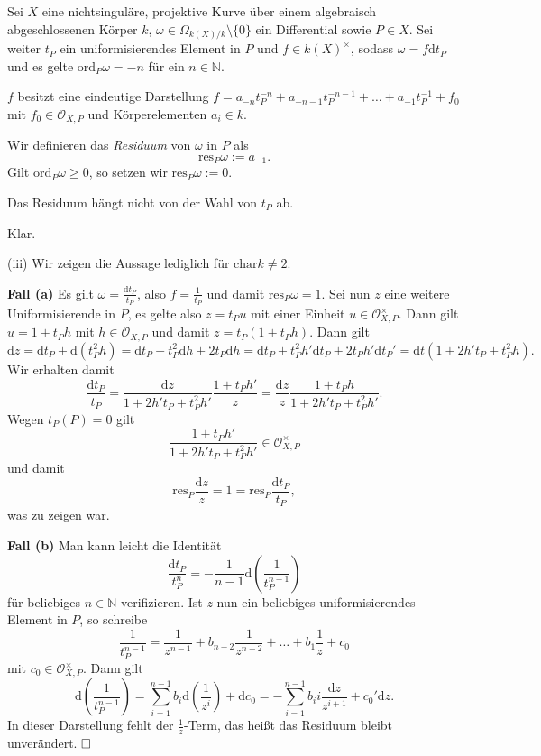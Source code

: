 \documentclass[11pt]{book}
\theoremstyle{nonumberbreak}
\newenvironment{pr}[1][]{\ifthenelse{\equal{#1}{}}{\proof}{\proof[#1]}\rm}{\endproof}
\newenvironment{definbem}[1][]{\ifthenelse{\equal{#1}{}}{\definibem}{\definibem[#1]}\rm}{\enddefinibem}
\begin{document}
\begin{spacing}{1.4}
\begin{definbem}
Sei $X$ eine nichtsinguläre, projektive Kurve über einem algebraisch abgeschlossenen Körper $k$, $\omega \in \Omega_{k(X)/k} \setminus \{0\}$ ein Differential sowie $P \in X$. Sei weiter $t_P$ ein uniformisierendes Element in $P$ und $f \in k(X)^{\times}$, sodass $\omega = f \mathrm{d}t_P$ und es gelte $\mathrm{ord}_P \omega = -n$ für ein $n \in \mathbb{N}$.
\begin{compactenum}
\item $f$ besitzt eine eindeutige Darstellung $f=a_{-n}t_P^{-n} + a_{-n-1} t_P^{-n-1} + \ldots + a_{-1} t_P^{-1} + f_0$ mit $f_0 \in \mathcal{O}_{X,P}$ und Körperelementen $a_i \in k$.
\item Wir definieren das \textit{Residuum} von $\omega$ in $P$ als 
$$\mathrm{res}_P \omega := a_{-1}.$$
Gilt $\mathrm{ord}_P \omega \geqslant 0$, so setzen wir $\mathrm{res}_P \omega :=0$.
\item Das Residuum hängt nicht von der Wahl von $t_P$ ab.
\end{compactenum}
\begin{pr}
\begin{compactenum}
\item Klar.
\item[(iii)] Wir zeigen die Aussage lediglich für $\mathrm{char}k \neq 2$.
\begin{compactenum}

\item[\textbf{Fall (a)}] Es gilt $\omega = \frac{\mathrm{d}t_P}{t_P}$, also $f= \frac{1}{t_P}$ und damit $\mathrm{res}_P \omega = 1$. Sei nun $z$ eine weitere Uniformisierende in $P$, es gelte also $z = t_Pu$ mit einer Einheit $u \in \mathcal{O}_{X,P}^{\times}$. Dann gilt $u=1 + t_P h$ mit $h \in \mathcal{O}_{X,P}$ und damit $z= t_P ( 1 + t_P h)$. Dann gilt 
$$\mathrm{d}z = \mathrm{d}t_P + \mathrm{d}(t_P^2h) = \mathrm{d}t_P + t_P^2 \mathrm{d}h + 2t_P \mathrm{d}h = \mathrm{d}t_P + t_P^2 h' \mathrm{d}t_P + 2 t_P h' \mathrm{d}t_P' =  \mathrm{d}t ( 1 + 2h't_P + t_P^2h).$$
Wir erhalten damit 
$$\frac{\mathrm{d}t_P}{t_P} = \frac{\mathrm{d}z}{1 + 2h't_P + t_P^2 h'} \frac{1 + t_Ph'}{z} = \frac{\mathrm{d}z}{z} \frac{1 + t_Ph}{1 + 2h't_P + t_P^2h'}.$$
Wegen $t_P(P)=0$ gilt $$\frac{1+t_Ph'}{1 + 2h't_P + t_P^2h'} \in \mathcal{O}_{X,P}^{\times}$$ und damit
$$\mathrm{res}_P \frac{\mathrm{d}z}{z} = 1 = \mathrm{res}_P \frac{\mathrm{d}t_P}{t_P},$$
was zu zeigen war.
\item[\textbf{Fall (b)}] Man kann leicht die Identität
$$\frac{\mathrm{d}t_P}{t_P^n} = - \frac{1}{n-1} \mathrm{d} \left(\frac{1}{t_P^{n-1}}\right)$$
für beliebiges $n \in \mathbb{N}$ verifizieren. Ist $z$ nun ein beliebiges uniformisierendes Element in $P$, so schreibe
$$\frac{1}{t_P^{n-1}} = \frac{1}{z^{n-1}} + b_{n-2} \frac{1}{z^{n-2}} + \ldots + b_1 \frac{1}{z} + c_0$$
mit $c_0 \in \mathcal{O}_{X,P}^{\times}$. Dann gilt 
$$\mathrm{d} \left( \frac{1}{t_P^{n-1}}\right) = \sum_{i=1}^{n-1} b_i \mathrm{d} \left(\frac{1}{z^{i}} \right) + \mathrm{d}c_0 = - \sum_{i=1}^{n-1} b_i i \frac{\mathrm{d}z}{z^{i+1}} + c_0' \mathrm{d}z.$$
In dieser Darstellung fehlt der $\frac{1}{z}$-Term, das heißt das Residuum bleibt unverändert. $\hfill \Box$


\end{compactenum}
\end{compactenum}
\end{pr}
\end{definbem}
\end{spacing}
\end{document}
